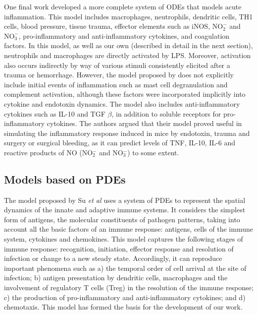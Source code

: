 \documentclass[10pt]{bmc_article}
\newenvironment{bmcformat}{\baselineskip20pt\sloppy\setboolean{publ}{false}}{\baselineskip20pt\sloppy}
\begin{document}
\begin{bmcformat}
One final work \cite{Vodovotz2006} developed a more complete system of ODEs that models acute inflammation. This model includes 
macrophages, neutrophils, dendritic cells, TH1 cells, blood pressure, tissue trauma, effector elements such as iNOS, 
$\mathrm{NO_2^-}$ and $\mathrm{NO_3^-}$, pro-inflammatory and anti-inflammatory cytokines, and coagulation factors. In this model, 
as well as our own (described in detail in the next section), 
neutrophils and macrophages are directly activated by LPS. Moreover, activation also occurs indirectly by way of various stimuli 
consistently elicited after a trauma or hemorrhage. However, the model proposed by \cite{Vodovotz2006} does not explicitly include 
initial events of inflammation such as mast cell degranulation and complement activation, although these 
factors were incorporated implicitly into cytokine and endotoxin dynamics. The model also includes anti-inflammatory cytokines such 
as IL-10 and TGF $\beta$, in addition to soluble receptors for pro-inflammatory cytokines. The authors argued that their model proved 
useful in simulating the inflammatory response induced in mice by endotoxin, trauma and surgery or surgical bleeding, as it can predict 
levels of TNF, IL-10, IL-6 and reactive products of NO (NO$_{2}^{-}$ and NO$_{3}^{-}$) to some extent. 

\subsection*{Models based on PDEs}

The model proposed by Su \textit{et al} \cite{localmodel} uses a system of PDEs to represent the spatial dynamics of the innate and 
adaptive immune systems. It considers the simplest form of antigens, the molecular constituents of pathogen patterns, taking into 
account all the basic factors of an immune response: antigens, cells of the immune system, cytokines and chemokines. This model 
captures the following stages of immune response: recognition, initiation, effector response and resolution of infection or change 
to a new steady state. Accordingly, it can reproduce important phenomena such as a) the temporal order of cell arrival at the site 
of infection; b) antigen presentation by dendritic cells, macrophages and the involvement of regulatory T cells (Treg) in the
resolution of the immune response; c) the production of pro-inflammatory and anti-inflammatory cytokines; and d) chemotaxis. This 
model has formed the basis for the development of our work.


\end{bmcformat}
\end{document}
